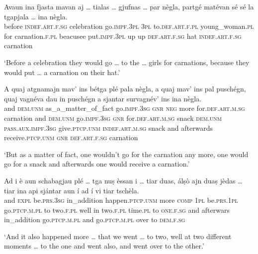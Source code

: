 \begin{linenumbers}
	\gll    Avaun ina fjasta mavan aj … tialas … gjufnas … par nègla, partgé matévan sé sé la tgapjala … ina nègla.\\
	before \textsc{indef.art.f.sg} celebration go.\textsc{impf.3pl} \textsc{3pl} {} to.\textsc{def.art.f.pl} {}  young\_woman.\textsc{pl} {} for carnation.\textsc{f.pl} beacusee put.\textsc{impf.3pl} up up  \textsc{def.art.f.sg} hat {} \textsc{indef.art.f.sg} carnation \\
\end{linenumbers}
\medskip
\glt `Before a celebration they would go … to the … girls for carnations, because they would put … a carnation on their hat.'
\medskip

\begin{linenumbers}
	\gll    A quaj atgnamajn mav’ ins bétga plé pala nègla, a quaj mav’ ins pal puschégn, quaj vagnéva dau in puschégn a sjantar survagnév’ ins ina nègla.\\
	and  \textsc{dem.unm} as\_a\_matter\_of\_fact  go.\textsc{impf.3sg} \textsc{gnr} \textsc{neg} more for.\textsc{def.art.m.sg} carnation and \textsc{dem.unm} go.\textsc{impf.3sg} \textsc{gnr} for.\textsc{def.art.m.sg} snack \textsc{dem.unm} \textsc{pass.aux.impf.3sg} give.\textsc{ptcp.unm} \textsc{indef.art.m.sg} snack and afterwards receive.\textsc{ptcp.unm} \textsc{gnr} \textsc{def.art.f.sg} carnation\\
\end{linenumbers}
\medskip
\glt `But as a matter of fact, one wouldn’t go for the carnation any more, one would go for a snack and afterwards one would receive a carnation.'
\medskip

\begin{linenumbers}
	\gll    Ad i è aun schabagjau plé … tga nuṣ èssan i … tiar duas, álṣò ajn duaṣ jèdas … tiar ina api sjántar aun í ad í vi tiar tschèla.\\
	and \textsc{expl} be.\textsc{prs.3sg} in\_addition happen.\textsc{ptcp.unm} more {} \textsc{comp}  \textsc{1pl} be.\textsc{prs.1pl} go.\textsc{ptcp.m.pl} {} to two.\textsc{f.pl} well in two.\textsc{f.pl} time.\textsc{pl} {} to \textsc{one.f.sg} and afterwars in\_addition go.\textsc{ptcp.m.pl} and  go.\textsc{ptcp.m.pl} over to \textsc{dem.f.sg}\\
\end{linenumbers}
\medskip
\glt `And it also happened more … that we went … to two, well at two different moments … to the one and went also, and went over to the other.'
\medskip

